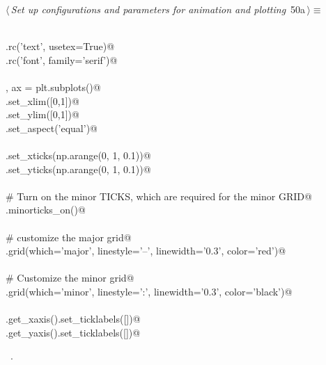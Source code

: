 \documentclass[11.5pt]{report}
\begin{document}
\begin{flushleft} \small
\begin{minipage}{\linewidth}\label{scrap72}\raggedright\small
{} $\langle\,${\itshape Set up configurations and parameters for animation and plotting}\nobreak\ {\footnotesize {50a}}$\,\rangle\equiv$
\vspace{-1ex}
\begin{list}{}{} \item
\mbox{}\verb@@\\
\mbox{}\verb@plt.rc('text', usetex=True)@\\
\mbox{}\verb@plt.rc('font', family='serif')@\\
\mbox{}\verb@@\\
\mbox{}\verb@fig, ax = plt.subplots()@\\
\mbox{}\verb@ax.set_xlim([0,1])@\\
\mbox{}\verb@ax.set_ylim([0,1])@\\
\mbox{}\verb@ax.set_aspect('equal')@\\
\mbox{}\verb@@\\
\mbox{}\verb@ax.set_xticks(np.arange(0, 1, 0.1))@\\
\mbox{}\verb@ax.set_yticks(np.arange(0, 1, 0.1))@\\
\mbox{}\verb@@\\
\mbox{}\verb@# Turn on the minor TICKS, which are required for the minor GRID@\\
\mbox{}\verb@ax.minorticks_on()@\\
\mbox{}\verb@@\\
\mbox{}\verb@# customize the major grid@\\
\mbox{}\verb@ax.grid(which='major', linestyle='--', linewidth='0.3', color='red')@\\
\mbox{}\verb@@\\
\mbox{}\verb@# Customize the minor grid@\\
\mbox{}\verb@ax.grid(which='minor', linestyle=':', linewidth='0.3', color='black')@\\
\mbox{}\verb@@\\
\mbox{}\verb@ax.get_xaxis().set_ticklabels([])@\\
\mbox{}\verb@ax.get_yaxis().set_ticklabels([])@\\
\mbox{}\verb@@{\NWsep}
\end{list}
\vspace{-1.5ex}
\footnotesize
\begin{list}{}{\setlength{\itemsep}{-\parsep}\setlength{\itemindent}{-\leftmargin}}
\item \NWtxtMacroRefIn\ .

\item{}
\end{list}
\end{minipage}\vspace{4ex}
\end{flushleft}
\end{document}
